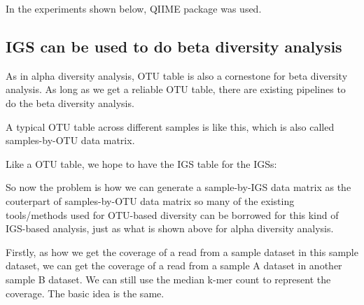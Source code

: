 \documentclass{article}
\begin{document}
In the experiments shown below, QIIME package was used. 




\subsection{IGS can be used to do beta diversity analysis}

As in alpha diversity analysis, OTU table is also a cornestone for beta diversity analysis. As long as we get a reliable OTU table, there are existing pipelines to do the beta diversity analysis. 

A typical OTU table across different samples is like this, which is also called samples-by-OTU data matrix.


    
Like a OTU table, we hope to have the IGS table for the IGSs:


    
    So now the problem is how we can generate a sample-by-IGS data matrix as the couterpart of samples-by-OTU data matrix so many of  the existing tools/methods used for OTU-based diversity can be borrowed for this kind of IGS-based analysis, just as what is shown above for alpha diversity analysis.

Firstly, as how we get the coverage of a read from a sample dataset in this sample dataset, we can get the coverage of a read from a sample A dataset in another sample B dataset. We can still use the median k-mer count to represent the coverage. The basic idea is the same. 

\end{document}
